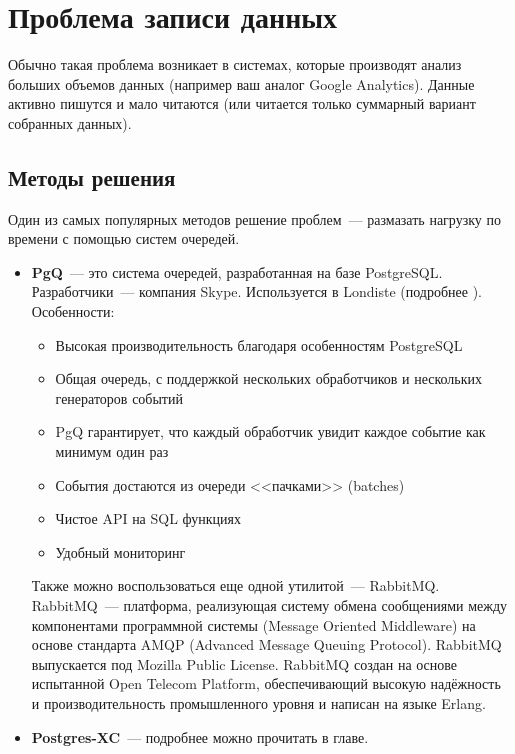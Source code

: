 \section{Проблема записи данных}

Обычно такая проблема возникает в системах, которые производят анализ больших объемов данных (например ваш аналог Google Analytics). 
Данные активно пишутся и мало читаются (или читается только суммарный вариант собранных данных).

\subsection{Методы решения}

Один из самых популярных методов решение проблем~--- размазать нагрузку по времени с помощью систем очередей.
\begin{itemize}
\item \textbf{PgQ}~--- это система очередей, разработанная на базе PostgreSQL. Разработчики~--- компания Skype. 
Используется в Londiste (подробнее ). Особенности:
\begin{itemize}
\item Высокая производительность благодаря особенностям PostgreSQL
\item Общая очередь, с поддержкой нескольких обработчиков и нескольких генераторов событий
\item PgQ гарантирует, что каждый обработчик увидит каждое событие как минимум один раз
\item События достаются из очереди <<пачками>> (batches)
\item Чистое API на SQL функциях
\item Удобный мониторинг
\end{itemize}

Также можно воспользоваться еще одной утилитой~--- RabbitMQ. 
RabbitMQ~--- платформа, реализующая систему обмена сообщениями между компонентами программной системы (Message Oriented Middleware) 
на основе стандарта AMQP (Advanced Message Queuing Protocol). RabbitMQ выпускается под Mozilla Public License.
RabbitMQ создан на основе испытанной Open Telecom Platform, обеспечивающий высокую надёжность и производительность промышленного 
уровня и написан на языке Erlang.

\item \textbf{Postgres-XC}~--- подробнее можно прочитать в  главе.
\end{itemize}